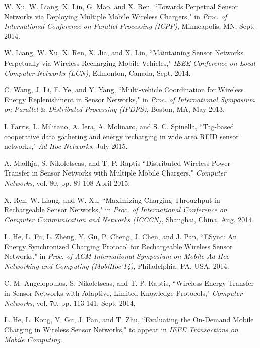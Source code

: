 \documentclass[twocolumn,10pt]{IEEEtran}
\begin{document}
\begin{thebibliography}{99}
W. Xu, W. Liang, X. Lin, G. Mao, and X. Ren, 
``Towards Perpetual Sensor Networks via Deploying Multiple Mobile Wireless Chargers," in \emph{Proc. of International Conference on
Parallel Processing (ICPP)}, Minneapolis, MN, Sept. 2014. 

W. Liang, W. Xu, X. Ren, X. Jia, and X. Lin, ``Maintaining Sensor Networks Perpetually via Wireless Recharging Mobile Vehicles," \emph{IEEE Conference on Local Computer Networks (LCN)}, Edmonton, Canada, Sept. 2014.


C. Wang,  J. Li,  F. Ye, and Y. Yang, ``Multi-vehicle Coordination for Wireless Energy Replenishment in Sensor Networks," in \emph{Proc. of International Symposium on  Parallel $\&$ Distributed Processing (IPDPS)}, Boston, MA, May 2013.  

I. Farris, L. Militano, A. Iera, A. Molinaro,  and S. C. Spinella, ``Tag-based cooperative data gathering and energy recharging in wide area RFID sensor networks," 
\emph{Ad Hoc Networks},  July 2015.



A. Madhja, S. Nikoletseas, and T. P. Raptis 
``Distributed Wireless Power Transfer in Sensor Networks with Multiple Mobile Chargers,"
\emph{Computer Networks}, vol. 80, pp. 89-108  April 2015.  

X. Ren, W. Liang, and W. Xu, ``Maximizing Charging Throughput in Rechargeable Sensor Networks," in \emph{Proc. of International Conference on Computer Communication and Networks (ICCCN)}, Shanghai, China, Aug. 2014. 

L. He, L. Fu, L. Zheng, Y. Gu, P. Cheng, J. Chen, and J. Pan,
``ESync: An Energy Synchronized Charging Protocol for Rechargeable Wireless Sensor Networks," in \emph{Proc. of ACM International Symposium on Mobile Ad Hoc Networking and Computing (MobiHoc'14)}, Philadelphia, PA, USA, 2014.

C. M. Angelopoulos, S. Nikoletseas, and T. P. Raptis, ``Wireless Energy Transfer in Sensor Networks with Adaptive, Limited Knowledge Protocols," \emph{Computer Networks}, vol. 70, pp. 113-141, Sept. 2014, 

 

L. He, L. Kong, Y. Gu, J. Pan, and T. Zhu, ``Evaluating the On-Demand Mobile Charging in Wireless Sensor Networks," to appear in \emph{IEEE Transactions on Mobile Computing}. 


\end{thebibliography}
\end{document}

